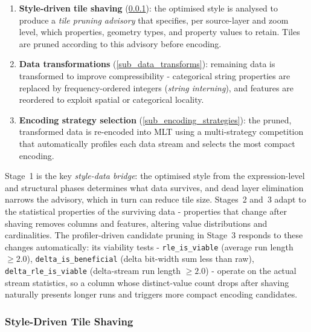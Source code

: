 \begin{enumerate}
    \item \textbf{Style-driven tile shaving} (\cref{sub_tile_shaving}): the optimised style is analysed to produce a \emph{tile pruning advisory} that specifies, per source-layer and zoom level, which properties, geometry types, and property values to retain.
    Tiles are pruned according to this advisory before encoding.
    \item \textbf{Data transformations} (\cref{sub_data_transforms}): remaining data is transformed to improve compressibility - categorical string properties are replaced by frequency-ordered integers (\emph{string interning}), and features are reordered to exploit spatial or categorical locality.
    \item \textbf{Encoding strategy selection} (\cref{sub_encoding_strategies}): the pruned, transformed data is re-encoded into \ac{MLT} using a multi-strategy competition that automatically profiles each data stream and selects the most compact encoding.
\end{enumerate}

\noindent Stage~1 is the key \emph{style-data bridge}: the optimised style from the expression-level and structural phases determines what data survives, and dead layer elimination narrows the advisory, which in turn can reduce tile size.
Stages~2 and~3 adapt to the statistical properties of the surviving data - properties that change after shaving removes columns and features, altering value distributions and cardinalities.
The profiler-driven candidate pruning in Stage~3 responds to these changes automatically: its viability tests - \texttt{rle\_is\_viable} (average run length $\geq 2.0$), \texttt{delta\_is\_beneficial} (delta bit-width sum less than raw), \texttt{delta\_rle\_is\_viable} (delta-stream run length $\geq 2.0$) - operate on the actual stream statistics, so a column whose distinct-value count drops after shaving naturally presents longer runs and triggers more compact encoding candidates.

\subsubsection{Style-Driven Tile Shaving}\label{sub_tile_shaving}

